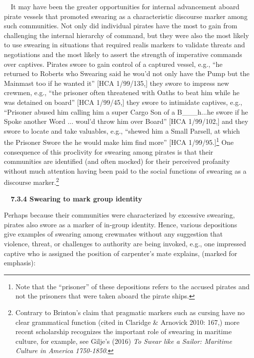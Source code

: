 \begin{styleStandard}
\ \ It may have been the greater opportunities for internal advancement aboard pirate vessels that promoted swearing as a characteristic discourse marker among such communities. Not only did individual pirates have the most to gain from challenging the internal hierarchy of command, but they were also the most likely to use swearing in situations that required realis markers to validate threats and negotiations and the most likely to assert the strength of imperative commands over captives. Pirates swore to gain control of a captured vessel, e.g., “he returned to Roberts who Swearing said he wou’d not only have the Pump but the Mainmast too if he wanted it” [HCA 1/99/135,] they swore to impress new crewmen, e.g., “the prisoner often threatened with Oaths to beat him while he was detained on board” [HCA 1/99/45,] they swore to intimidate captives, e.g., “Prisoner abused him calling him a super Cargo Son of a B\_\_\_h...he swore if he Spoke another Word ... woul’d throw him over Board” [HCA 1/99/102,] and they swore to locate and take valuables, e.g., “shewed him a Small Parsell, at which the Prisoner Swore the he would make him find more” [HCA 1/99/95.]\footnote{ Note that the “prisoner” of these depositions refers to the accused pirates and not the prisoners that were taken aboard the pirate ships. } One consequence of this proclivity for swearing among pirates is that their communities are identified (and often mocked) for their perceived profanity without much attention having been paid to the social functions of swearing as a discourse marker.\footnote{ Contrary to Brinton’s claim that pragmatic markers such as cursing have no clear grammatical function (cited in Claridge \& Arnovick 2010: 167,) more recent scholarship recognizes the important role of swearing in maritime culture, for example, see Gilje’s (2016) \textit{To Swear like a Sailor: Maritime Culture in America 1750-1850}.} 
\end{styleStandard}

\begin{styleStandard}
\ \ \textbf{7.3.4 Swearing to mark group identity}
\end{styleStandard}

\begin{styleStandard}
Perhaps because their communities were characterized by excessive swearing, pirates also swore as a marker of in-group identity. Hence, various depositions give examples of swearing among crewmates without any suggestion that violence, threat, or challenges to authority are being invoked, e.g., one impressed captive who is assigned the position of carpenter’s mate explains, (marked for emphasis): 
\end{styleStandard}

